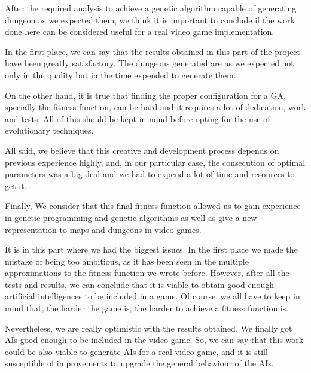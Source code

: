 After the required analysis to achieve a genetic algorithm capable of generating dungeon as we expected them, we think it is important to conclude if the work done here can be considered useful for a real video game implementation.\par
In the first place, we can say that the results obtained in this part of the project have been greatly satisfactory. The dungeons generated are as we expected not only in the quality but in the time expended to generate them.\par
On the other hand, it is true that finding the proper configuration for a GA, specially the fitness function, can be hard and it requires a lot of dedication, work and tests. All of this should be kept in mind before opting for the use of evolutionary techniques.\par
All said, we believe that this creative and development process depends on previous experience highly, and, in our particular case, the consecution of optimal parameters was a big deal and we had to expend a lot of time and resources to get it.\par
Finally, We consider that this final fitness function allowed us to gain experience in genetic programming and genetic algorithms as well as give a new representation to maps and dungeons in video games.\par

It is in this part where we had the biggest issues. In the first place we made the mistake of being too ambitious, as it has been seen in the multiple approximations to the fitness function we wrote before. However, after all the tests and results, we can conclude that it is viable to obtain good enough artificial intelligences to be included in a game. Of course, we all have to keep in mind that, the harder the game is, the harder to achieve a fitness function is.\par
Nevertheless, we are really optimistic with the results obtained. We finally got AIs good enough to be included in the video game. So, we can say that this work could be also viable to generate AIs for a real video game, and it is still susceptible of improvements to upgrade the general behaviour of the AIs.\par
